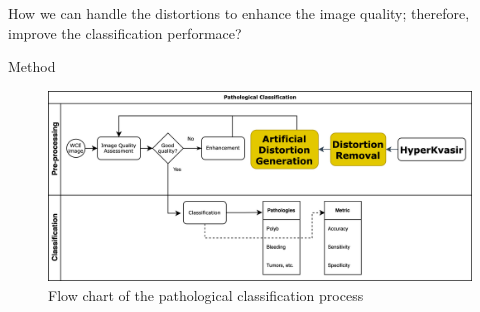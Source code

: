 \documentclass{libs/ufc_format}
\newcommand{\tikzmark}[1]{\tikz[overlay,remember picture] \node (#1) {};}
\begin{document}






\begin{frame}
    \centering
    \large How we can handle the distortions to enhance the image quality; therefore, improve the classification performace?
\end{frame}
\begin{frame}{Method}
    \begin{figure}
        \centering
        \includegraphics[scale=0.09]{libs/algorithm.png}
        \caption{ Flow chart of the pathological classification process}
        \label{fig:al}
    \end{figure}
\end{frame}
\end{document}
